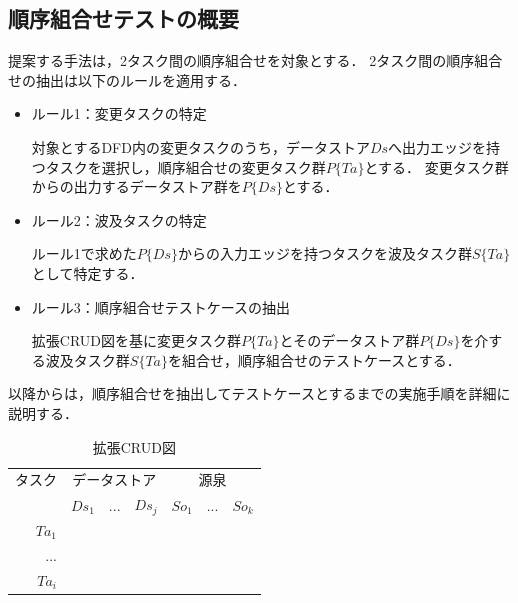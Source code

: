 \documentclass[a4paper,12pt]{jreport}
\begin{document}
\subsection{順序組合せテストの概要}
提案する手法は，2タスク間の順序組合せを対象とする．
2タスク間の順序組合せの抽出は以下のルールを適用する．
\begin{itemize}

\item ルール1：変更タスクの特定

対象とするDFD内の変更タスクのうち，データストア$Ds$へ出力エッジを持つタスクを選択し，順序組合せの変更タスク群$P\{Ta\}$とする．%
変更タスク群からの出力するデータストア群を$P\{Ds\}$とする．

\item ルール2：波及タスクの特定

ルール1で求めた$P\{Ds\}$からの入力エッジを持つタスクを波及タスク群$S\{Ta\}$として特定する．

\item ルール3：順序組合せテストケースの抽出

拡張CRUD図を基に変更タスク群$P\{Ta\}$とそのデータストア群$P\{Ds\}$を介する波及タスク群$S\{Ta\}$を組合せ，順序組合せのテストケースとする．
\end{itemize}

以降からは，順序組合せを抽出してテストケースとするまでの実施手順を詳細に説明する．

\begin{table}[t]
\caption{拡張CRUD図}
\label{CRUDIO}
\begin{center}
\begin{tabular}{r|r|r|r|r|r|r}
\multicolumn{1}{c|}{タスク} & \multicolumn{3}{c|}{データストア} & \multicolumn{3}{c}{源泉} \\
\cline{2-7}\multicolumn{1}{c|}{} & $Ds_1$ & $...$ & $Ds_j$ & $So_1$ & $...$ & $So_k$ \\
\hline
\hline
$Ta_1$ &   &   &   &   &   &  \\
\hline
$...$ &   &   &   &   &   &  \\
\hline
$Ta_i$ &   &   &   &   &   &  \\
    \hline
\end{tabular}%
\end{center}
\end{table}
\end{document}

